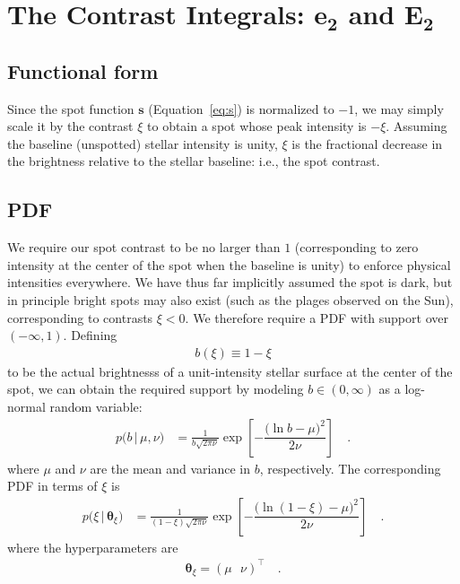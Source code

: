 \documentclass[modern]{aastex62}
\begin{document}
\section{The Contrast Integrals: \lowercase{$\mathbf{e_2}$} and $\mathbf{E_2}$}
\label{sec:contrast}
%
\subsection{Functional form}
\label{sec:contrast-function}
Since the spot function $\mathbf{s}$ (Equation~\ref{eq:s}) is normalized
to $-1$, we may simply scale it by the contrast $\xi$ to obtain a spot
whose peak intensity is $-\xi$.
Assuming the baseline (unspotted) stellar intensity is unity, $\xi$
is the fractional decrease in the brightness relative to the stellar
baseline: i.e., the spot contrast.
%

\subsection{PDF}
\label{sec:contrast-pdf}
We require our
spot contrast to be no larger than $1$ (corresponding to zero intensity
at the center of the spot when the baseline is unity) to enforce physical
intensities
everywhere. We have thus far implicitly assumed the spot is dark, but
in principle bright spots may also exist
(such as the plages observed on the Sun), corresponding to contrasts
$\xi < 0$. We therefore require a PDF with support over $(-\infty, 1)$.
Defining
%
\begin{align}
    b(\xi) \equiv 1 - \xi
\end{align}
%
to be the actual brightnesss of a unit-intensity stellar surface at
the center of the spot,
we can obtain the required support by modeling
$b \in (0, \infty)$ as a log-normal
random variable:
%
\begin{align}
    \label{eq:lognormal}
    p \big(b \, \big| \, \mu, \nu \big)
     & =
    \frac{1}{b\sqrt{2\pi\nu}}
    \exp\left[
        -\dfrac{\big(\ln b - \mu\big)^2}{2\nu}
        \right]
    \quad.
\end{align}
%
where $\mu$ and $\nu$ are the mean and variance in $b$, respectively.
The corresponding PDF in terms of $\xi$ is
%
\begin{align}
    \label{eq:lognormal}
    p \big(\xi \, \big| \, \pmb{\theta}_\xi \big)
     & =
    \frac{1}{(1 - \xi)\sqrt{2\pi\nu}}
    \exp\left[
        -\dfrac{\big(\ln (1 - \xi) - \mu\big)^2}{2\nu}
        \right]
    \quad.
\end{align}
%
where the hyperparameters are
%
\begin{align}
    \pmb{\theta}_\xi = \left(
    \mu \, \, \, \,
    \nu \right)^\top
    \quad.
\end{align}
%
\end{document}
